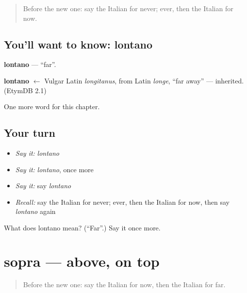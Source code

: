 \label{lesson:IT-C79-lontano}



\begin{quote}
Before the new one: say the Italian for never; ever, then the Italian for now.
\end{quote}

\subsection*{You'll want to know: lontano}
\textbf{lontano} — \textquotedblleft{}far\textquotedblright{}.

\begin{cousinweb}
\textbf{lontano} $\leftarrow$ Vulgar Latin \emph{longitanus}, from Latin \emph{longe}, \textquotedblleft{}far away\textquotedblright{} — inherited. (EtymDB 2.1)
\end{cousinweb}

\begin{grammarlens}[title={What you've built}]
One more word for this chapter.
\end{grammarlens}

\subsection*{Your turn}
\begin{itemize}
\raggedright
  \item \emph{Say it:} \emph{lontano}
  \item \emph{Say it:} \emph{lontano}, once more
  \item \emph{Say it:} say \emph{lontano}
  \item \emph{Recall:} say the Italian for never; ever, then the Italian for now, then say \emph{lontano} again
\end{itemize}

\begin{tcolorbox}[breakable,colback=teal!4,colframe=teal!35!black,title={Before you move on}]
What does lontano mean? (\textquotedblleft{}Far\textquotedblright{}.) Say it once more.
\end{tcolorbox}
\section[sopra]{sopra — above, on top}

\label{lesson:IT-C79-sopra}



\begin{quote}
Before the new one: say the Italian for now, then the Italian for far.
\end{quote}

